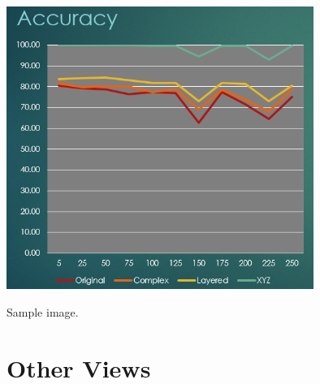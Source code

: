 \documentclass[]{report}
\begin{document}
\begin{minipage}{\linewidth}
	\begin{minipage}{0.49\textwidth}
		\centering
		\includegraphics[width=0.75\textwidth]{../images/accuracy}
	\end{minipage}
	\hfill
	\begin{minipage}{0.49\textwidth}
		\centering
		Sample image.
	\end{minipage}
\end{minipage}

\section{Other Views}
\end{document}
